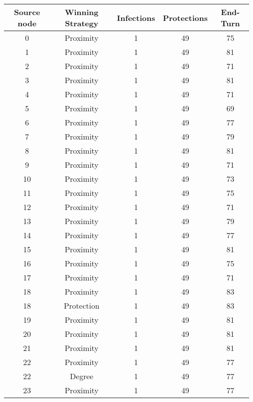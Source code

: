 \documentclass[results.tex]{subfiles}
\begin{document}
\begin{center}
  \begin{tabular}{| c || c | c | c | c |}
    \hline
    {\bfseries Source node} & {\bfseries Winning Strategy} & {\bfseries Infections} & {\bfseries Protections} & {\bfseries End-Turn} \\  %
    \hline\hline
    0 & Proximity & 1 & 49 & 75 \\ 
    \hline
    1 & Proximity & 1 & 49 & 81 \\ 
    \hline
    2 & Proximity & 1 & 49 & 71 \\ 
    \hline
    3 & Proximity & 1 & 49 & 81 \\ 
    \hline
    4 & Proximity & 1 & 49 & 71 \\ 
    \hline
    5 & Proximity & 1 & 49 & 69 \\ 
    \hline
    6 & Proximity & 1 & 49 & 77 \\ 
    \hline
    7 & Proximity & 1 & 49 & 79 \\ 
    \hline
    8 & Proximity & 1 & 49 & 81 \\ 
    \hline
    9 & Proximity & 1 & 49 & 71 \\ 
    \hline
    10 & Proximity & 1 & 49 & 73 \\ 
    \hline
    11 & Proximity & 1 & 49 & 75 \\ 
    \hline
    12 & Proximity & 1 & 49 & 71 \\ 
    \hline
    13 & Proximity & 1 & 49 & 79 \\ 
    \hline
    14 & Proximity & 1 & 49 & 77 \\ 
    \hline
    15 & Proximity & 1 & 49 & 81 \\ 
    \hline
    16 & Proximity & 1 & 49 & 75 \\ 
    \hline
    17 & Proximity & 1 & 49 & 71 \\ 
    \hline
    18 & Proximity & 1 & 49 & 83 \\ 
    \hline
    18 & Protection & 1 & 49 & 83 \\ 
    \hline
    19 & Proximity & 1 & 49 & 81 \\ 
    \hline
    20 & Proximity & 1 & 49 & 81 \\ 
    \hline
    21 & Proximity & 1 & 49 & 81 \\ 
    \hline
    22 & Proximity & 1 & 49 & 77 \\ 
    \hline
    22 & Degree & 1 & 49 & 77 \\ 
    \hline
    23 & Proximity & 1 & 49 & 77 \\ 

\end{tabular}
\end{center}
\end{document}
